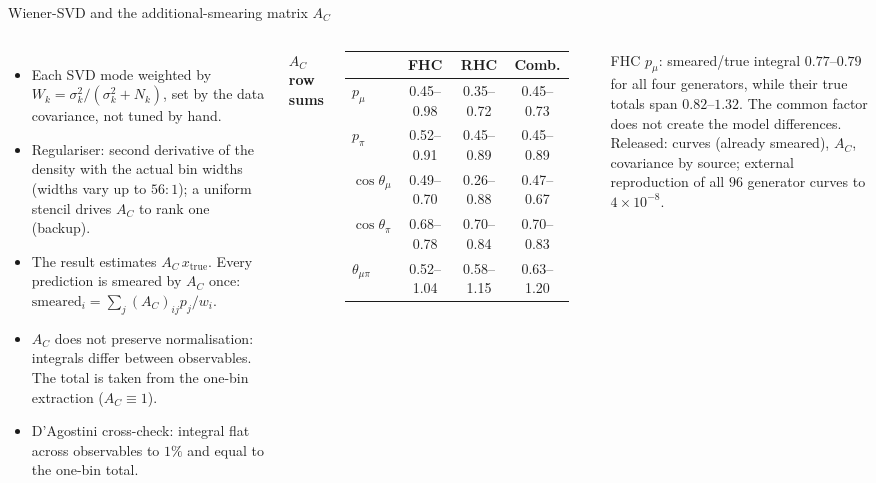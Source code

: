 \documentclass[aspectratio=169,10pt]{beamer}
\begin{document}
\begin{frame}{Wiener-SVD and the additional-smearing matrix $A_C$}
  \begin{columns}[T]
  \small
  \begin{itemize}\setlength\itemsep{3pt}
    \item Each SVD mode weighted by $W_k=\sigma_k^2/(\sigma_k^2+N_k)$, set by the data covariance, not tuned by hand.
    \item Regulariser: second derivative of the density with the actual bin widths (widths vary up to
      $56{:}1$); a uniform stencil drives $A_C$ to rank one (backup).
    \item The result estimates $A_C\,x_\mathrm{true}$. Every prediction is smeared by $A_C$ once:
      $\mathrm{smeared}_i=\sum_j (A_C)_{ij}p_j/w_i$.
    \item $A_C$ does not preserve normalisation: integrals differ between observables. The total is taken
      from the one-bin extraction ($A_C\equiv1$).
    \item D'Agostini cross-check: integral flat across observables to $1\%$ and equal to the one-bin total.
  \end{itemize}
  \scriptsize\centering\setlength{\tabcolsep}{3pt}
  \textbf{$A_C$ row sums}\\[1mm]
  \begin{tabular}{lccc}
    \toprule
    & FHC & RHC & Comb. \\\midrule
    $p_\mu$ & 0.45--0.98 & 0.35--0.72 & 0.45--0.73 \\
    $p_\pi$ & 0.52--0.91 & 0.45--0.89 & 0.45--0.89 \\
    $\cos\theta_\mu$ & 0.49--0.70 & 0.26--0.88 & 0.47--0.67 \\
    $\cos\theta_\pi$ & 0.68--0.78 & 0.70--0.84 & 0.70--0.83 \\
    $\theta_{\mu\pi}$ & 0.52--1.04 & 0.58--1.15 & 0.63--1.20 \\
    \bottomrule
  \end{tabular}\\[3mm]
  \raggedright
  FHC $p_\mu$: smeared/true integral $0.77$--$0.79$ for all four generators, while their true totals
  span $0.82$--$1.32$. The common factor does not create the model differences.\\[2mm]
  Released: curves (already smeared), $A_C$, covariance by source; external reproduction of all $96$
  generator curves to $4\times10^{-8}$.
  \end{columns}
\end{frame}
\end{document}
